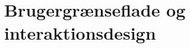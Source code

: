 \documentclass[a4paper]{article}
\begin{document}
\section{Brugergrænseflade og interaktionsdesign}
\end{document}
